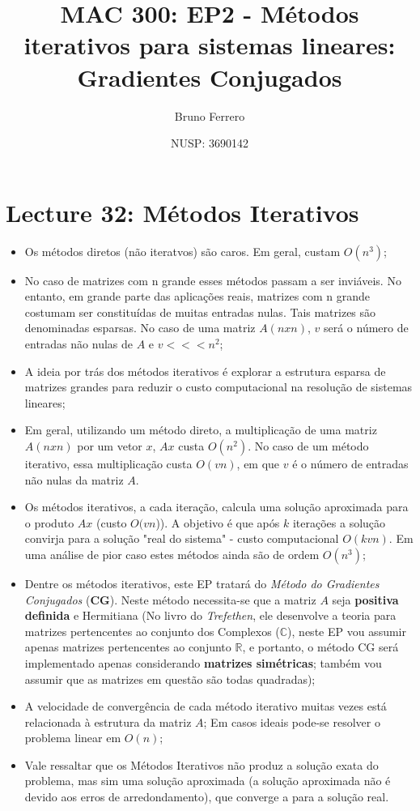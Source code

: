 \documentclass[a4paper,11pt]{article}
\title{MAC 300: EP2 - Métodos iterativos para sistemas lineares: Gradientes Conjugados}
\author{Bruno Ferrero}
\date{NUSP: 3690142}
\begin{document}
\maketitle

\section*{Lecture 32: Métodos Iterativos}

\begin{itemize}
\item Os métodos diretos (não iteratvos) são caros. Em geral, custam $O(n^3)$;
\item No caso de matrizes com n grande esses métodos passam a ser inviáveis. No entanto, em grande parte das aplicações reais, matrizes com n grande costumam ser constituídas de muitas entradas nulas. Tais matrizes são denominadas esparsas. No caso de uma matriz $A (n x n)$, $v$ será o número de entradas não nulas de $A$ e $v <<< n^2$;
\item A ideia por trás dos métodos iterativos é explorar a estrutura esparsa de matrizes grandes para reduzir o custo computacional na resolução de sistemas lineares;   
\item Em geral, utilizando um método direto, a multiplicação de uma matriz $A (n x n)$ por um vetor $x$, $Ax$ custa $O(n^2)$. No caso de um método iterativo, essa multiplicação custa $O(vn)$, em que $v$ é o número de entradas não nulas da matriz $A$.
\item Os métodos iterativos, a cada iteração, calcula uma solução aproximada para o produto $Ax$ (custo $O(vn$)). A objetivo é que após $k$ iterações a solução convirja para a solução "real do sistema" - custo computacional $O(kvn)$. Em uma análise de pior caso estes métodos ainda são de ordem $O(n^3)$;
\item Dentre os métodos iterativos, este EP tratará do \textit{Método do Gradientes Conjugados} (\textbf{CG}). Neste método necessita-se que a matriz $A$ seja \textbf{positiva definida} e Hermitiana (No livro do \textit{Trefethen}, ele desenvolve a teoria para matrizes pertencentes ao conjunto dos Complexos ($\mathbb{C}$), neste EP vou assumir apenas matrizes pertencentes ao conjunto $\mathbb{R}$, e portanto, o método CG será implementado apenas considerando \textbf{matrizes simétricas}; também vou assumir que as matrizes em questão são todas quadradas);
\item A velocidade de convergência de cada método iterativo muitas vezes está relacionada à estrutura da matriz $A$; Em casos ideais pode-se resolver o problema linear em $O(n)$; 
\item Vale ressaltar que os Métodos Iterativos não produz a solução exata do problema, mas sim uma solução aproximada (a solução aproximada não é devido aos erros de arredondamento), que converge a para a solução real. 
\end{itemize}
\end{document}
